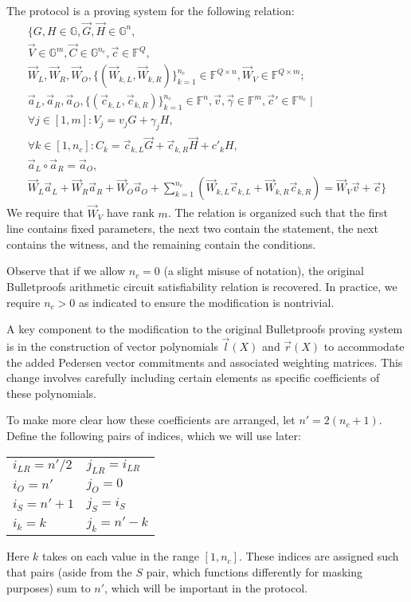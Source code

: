 \documentclass{article}
\newcommand{\GG}{\mathbb{G}}
\newcommand{\FF}{\mathbb{F}}
\newcommand{\mat}[1]{\vec{#1}}
\begin{document}
The protocol is a proving system for the following relation:
\begin{multline}
\label{eqn:relation}
\Biggl\{ G, H \in \GG, \vec{G}, \vec{H} \in \GG^n, \\
\vec{V} \in \GG^m, \vec{C} \in \GG^{n_c}, \vec{c} \in \FF^Q, \\
\mat{W}_L, \mat{W}_R, \mat{W}_O, \{ (\mat{W}_{k,L}, \mat{W}_{k,R}) \}_{k=1}^{n_c} \in \FF^{Q \times n}, \mat{W}_V \in \FF^{Q \times m} ; \\
\vec{a}_L, \vec{a}_R, \vec{a}_O, \{ (\vec{c}_{k,L}, \vec{c}_{k,R}) \}_{k=1}^{n_c} \in \FF^n, \vec{v}, \vec{\gamma} \in \FF^m, \vec{c}' \in \FF^{n_c} \mid \\
\forall j \in [1, m]: V_j = v_j G + \gamma_j H, \\
\forall k \in [1, n_c]: C_k = \vec{c}_{k,L} \vec{G} + \vec{c}_{k,R} \vec{H} + c'_k H, \\
\vec{a}_L \circ \vec{a}_R = \vec{a}_O, \\
\mat{W}_L \vec{a}_L + \mat{W}_R \vec{a}_R + \mat{W}_O \vec{a}_O + \sum_{k=1}^{n_c} \left( \mat{W}_{k,L} \vec{c}_{k,L} + \mat{W}_{k,R} \vec{c}_{k,R} \right) = \mat{W}_V \vec{v} + \vec{c} \Biggr\}
\end{multline}
We require that $\mat{W}_V$ have rank $m$.
The relation is organized such that the first line contains fixed parameters, the next two contain the statement, the next contains the witness, and the remaining contain the conditions.

Observe that if we allow $n_c = 0$ (a slight misuse of notation), the original Bulletproofs arithmetic circuit satisfiability relation is recovered.
In practice, we require $n_c > 0$ as indicated to ensure the modification is nontrivial.

A key component to the modification to the original Bulletproofs proving system is in the construction of vector polynomials $\vec{l}(X)$ and $\vec{r}(X)$ to accommodate the added Pedersen vector commitments and associated weighting matrices.
This change involves carefully including certain elements as specific coefficients of these polynomials.

To make more clear how these coefficients are arranged, let $n' = 2(n_c + 1)$.
Define the following pairs of indices, which we will use later:
\begin{center}
	\begin{tabular}{ll}
		$i_{LR} = n'/2$ & $j_{LR} = i_{LR}$ \\
		$i_O = n'$ & $j_O = 0$ \\
		$i_S = n' + 1$ & $j_S = i_S$ \\
		$i_k = k$ & $j_k = n' - k$
	\end{tabular}
\end{center}
Here $k$ takes on each value in the range $[1, n_c]$.
These indices are assigned such that pairs (aside from the $S$ pair, which functions differently for masking purposes) sum to $n'$, which will be important in the protocol.
\end{document}
